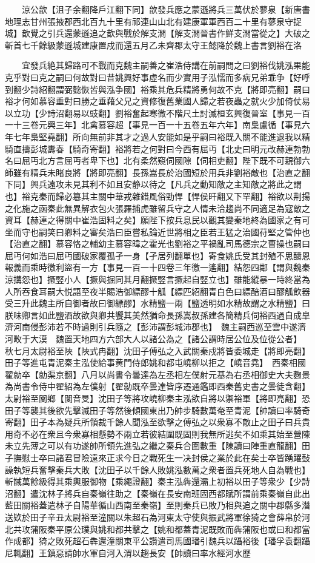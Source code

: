 　　涼公歆【沮子余翻降戶江翻下同】歆發兵應之蒙遜將兵三萬伏於蓼泉【新唐書地理志甘州張掖郡西北百九十里有祁連山山北有建康軍軍西百二十里有蓼泉守捉城】歆覺之引兵還蒙遜追之歆與戰於解支澗【解支澗晉書作鮮支澗當從之】大破之斬首七千餘級蒙遜城建康置戍而還五月乙未齊郡太守王懿降於魏上書言劉裕在洛

　　宜發兵絶其歸路可不戰而克魏主嗣善之崔浩侍講在前嗣問之曰劉裕伐姚泓果能克乎對曰克之嗣曰何故對曰昔姚興好事虛名而少實用子泓懦而多病兄弟乖争【好呼到翻少詩紹翻謂弼懿恢皆與泓争國】裕乘其危兵精將勇何故不克【將即亮翻】嗣曰裕才何如慕容垂對曰勝之垂藉父兄之資修復舊業國人歸之若夜蟲之就火少加倚仗易以立功【少詩沼翻易以豉翻】劉裕奮起寒微不階尺土討滅桓玄興復晉室【事見一百一十三卷元興三年】北禽慕容超【事見一百一十五卷五年六年】南梟盧循【事見六年七年梟堅堯翻】所向無前非其才之過人安能如是乎嗣曰裕既入關不能進退我以精騎直擣彭城夀春【騎奇寄翻】裕將若之何對曰今西有屈丏【北史曰明元改赫連勃勃名曰屈丏北方言屈丏者卑下也】北有柔然窺伺國隙【伺相吏翻】陛下既不可親御六師雖有精兵未睹良將【將即亮翻】長孫嵩長於治國短於用兵非劉裕敵也【治直之翻下同】興兵遠攻未見其利不如且安静以待之【凡兵之動知敵之主知敵之將此之謂也】裕克秦而歸必簒其主關中華戎雜錯風俗勁悍【悍侯旰翻又下罕翻】裕欲以荆揚之化施之函秦此無異解衣包火張羅捕虎雖留兵守之人情未洽趨尚不同適足為寇敵之資耳【赫連之得關中崔浩固料之矣】願陛下按兵息民以觀其變秦地終為國家之有可坐而守也嗣笑曰卿料之審矣浩曰臣嘗私論近世將相之臣若王猛之治國苻堅之管仲也【治直之翻】慕容恪之輔幼主慕容暐之霍光也劉裕之平禍亂司馬德宗之曹操也嗣曰屈丏何如浩曰屈丏國破家覆孤孑一身【孑居列翻單也】寄食姚氏受其封殖不思醻恩報義而乘時徼利盜有一方【事見一百一十四卷三年徼一遙翻】結怨四鄰【謂與魏秦涼搆怨也】撅竪小人【撅與掘同其月翻撅竪言撅起自竪立也】雖能縱暴一時終當為人所吞食耳嗣大悦語至夜半賜浩御縹醪十觚【縹匹紹翻青白色曰縹醅酒曰醪觚飲器受三升此魏主所自御者故曰御縹醪】水精鹽一兩【鹽透明如水精故謂之水精鹽】曰朕味卿言如此鹽酒故欲與卿共饗其美然猶命長孫嵩叔孫建各簡精兵伺裕西過自成臯濟河南侵彭沛若不時過則引兵隨之【彭沛謂彭城沛郡也】　魏主嗣西巡至雲中遂濟河畋于大漠　魏置天地四方六部大人以諸公為之【諸公謂時居公位及位從公者】　秋七月太尉裕至陜【陜式冉翻】沈田子傅弘之入武關秦戍將皆委城走【將即亮翻】田子等進屯青泥秦主泓使給事黄門侍郎姚和都屯嶢柳以拒之【嶢音堯】　西秦相國翟勍卒【勍渠京翻】八月以尚書令曇達為左丞相左僕射元基為右丞相御史大夫麴景為尚書令侍中翟紹為左僕射【翟勍既卒曇達皆序遷通鑑即西秦舊史書之曇徒含翻】　太尉裕至閺鄉【閺音旻】沈田子等將攻嶢柳秦主泓欲自將以禦裕軍【將即亮翻】恐田子等襲其後欲先擊滅田子等然後傾國東出乃帥步騎數萬奄至青泥【帥讀曰率騎奇寄翻】田子本為疑兵所領裁千餘人聞泓至欲擊之傅弘之以衆寡不敵止之田子曰兵貴用奇不必在衆且今衆寡相懸勢不兩立若彼結圍既固則我無所逃矣不如乘其始至營陳未立先薄之可以有功遂帥所領先進弘之繼之秦兵合圍數重【陳讀曰陣重直龍翻】田子撫慰士卒曰諸君冒險遠來正求今日之戰死生一决封侯之業於此在矣士卒皆踴躍鼔譟執短兵奮擊秦兵大敗【沈田子以千餘人敗姚泓數萬之衆者置兵死地人自為戰也】斬馘萬餘級得其乘輿服御物【乘繩證翻】秦主泓犇還灞上初裕以田子等衆少【少詩沼翻】遣沈林子將兵自秦嶺往助之【秦嶺在長安南班固西都賦所謂前乘秦嶺自此出藍田關裕蓋遣林子自陽華循山西南至秦嶺】至則秦兵已敗乃相與追之關中郡縣多潛送欵於田子辛丑太尉裕至潼關以朱超石為河東太守使與振武將軍徐猗之會薛帛於河北共攻蒲阪秦平原公璞與姚和都共擊之【姚和都蓋青泥既敗而犇蒲阪也或曰和都當作成都】猗之敗死超石犇還潼關東平公讚遣司馬國璠引魏兵以躡裕後【璠孚袁翻躡尼輒翻】王鎮惡請帥水軍自河入渭以趨長安【帥讀曰率水經河水歷